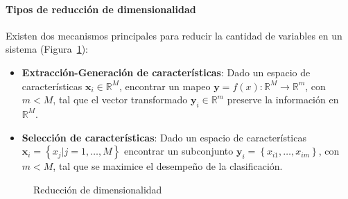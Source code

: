 \documentclass{article}
\begin{document}
\paragraph{Tipos de reducción de dimensionalidad}
\label{par:tipos_de_reduccion_de_dimensionalidad}
Existen dos mecanismos principales para reducir la cantidad de variables en un sistema (Figura~\ref{fig:reduccion-dimensionalidad}):
\begin{itemize}
	\item \textbf{Extracción-Generación de características}: Dado un espacio de características $\mathbf{x}_i \in \mathbb{R} ^M$, encontrar un mapeo $\mathbf{y} = f(x):\mathbb{R}^M \to \mathbb{R}^m$, con $m<M$, tal que el vector transformado $\mathbf{y}_i \in \mathbb{R}^m$ preserve la información en $\mathbb{R}^M$.
	\item \textbf{Selección de características}: Dado un espacio de características $\mathbf{x}_i = \left \{ x_j | j = 1, \ldots, M  \right \}$ encontrar un subconjunto $\mathbf{y}_i=\left \{x_{i1},\ldots,x_{im} \right \}$, con $m<M$, tal que se maximice el desempeño de la clasificación.
\end{itemize}

\begin{figure}
	\centering

	\caption{Reducción de dimensionalidad}
	\label{fig:reduccion-dimensionalidad}
\end{figure}
\end{document}
